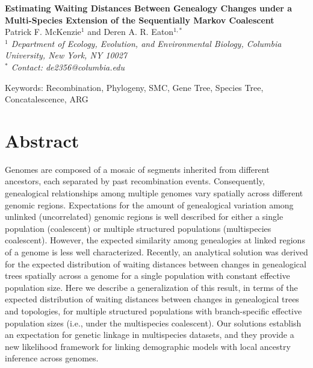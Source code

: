 \documentclass[11pt]{article}
\begin{document}
\begin{center}
	{\bf \Large
		Estimating Waiting Distances Between Genealogy Changes under a \\[0.25cm]
		Multi-Species Extension of the Sequentially Markov Coalescent
	}\\[0.5cm]

	Patrick F. McKenzie$^{1}$ and Deren A. R. Eaton$^{1, *}$\\[0.25cm]

	\emph{
	$^{1}$ Department of Ecology, Evolution, and Environmental Biology, Columbia University, New York, NY 10027\\[0.5cm]
	$^{*}$ Contact: de2356@columbia.edu\\[0.5cm]
	}
\end{center}

Keywords: Recombination, Phylogeny, SMC, Gene Tree, Species Tree, Concatalescence, ARG

\RaggedRight

\section*{Abstract}
Genomes are composed of a mosaic of segments inherited from different ancestors, 
each separated by past recombination events. Consequently, genealogical
relationships among multiple genomes vary spatially across different genomic 
regions. Expectations for the amount of genealogical variation among unlinked 
(uncorrelated) genomic regions is well described for either a single 
population (coalescent) or multiple structured populations (multispecies coalescent).
However, the expected similarity among genealogies at linked regions of a 
genome is less well characterized. 
Recently, an analytical solution was derived for the expected 
distribution of waiting distances between changes in genealogical trees 
spatially across a genome for a single population with constant effective 
population size. Here we describe a generalization of this 
result, in terms of the expected distribution of waiting distances between 
changes in genealogical trees and topologies, for multiple structured populations
with branch-specific effective population sizes (i.e., under the multispecies 
coalescent). Our solutions establish an expectation for genetic linkage  
in multispecies datasets, and they provide a new likelihood framework for linking
demographic models with local ancestry inference across genomes.
\end{document}
